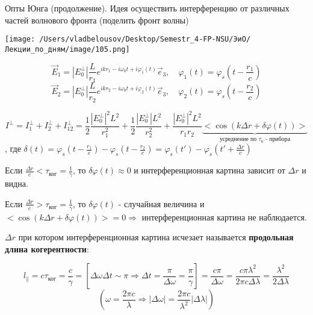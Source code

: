 \documentclass[12pt, a4paper]{report}
\begin{document}
\fi


Опты Юнга (продолжение). Идея осуществить интерференцию от различных частей волнового фронта (поделить фронт волны)

\begin{center}
    \texttt{[image: /Users/vladbelousov/Desktop/Semestr\_4-FP-NSU/ЭиО/Лекции\_по\_дням/image/105.png]}
\end{center}  

\[ \vec{E }  _1 = |E_0 ^{\perp }  | \frac{L}{r_1 } e^{i k r_1 - i \omega_0 t + i \varphi_1 (t)} \vec{e } _3   , \quad  \varphi_1 (t ) = \varphi_s \left(  t - \frac{r_1}{c}  \right)\] 
\[ \vec{E }  _2 = |E_0 ^{\perp }  | \frac{L}{r_2 } e^{i k r_2 - i \omega_0 t + i \varphi_2 (t)}\vec{e } _3  , \quad  \varphi_2 (t ) = \varphi_s \left(  t - \frac{r_2}{c}  \right)\] 

\[ I^{\perp } = I_1 ^{\perp } + I_2 ^{\perp } +I_{12} ^{\perp } =\frac{1}{2 }  \frac{|E_0  ^{\perp }  | ^2 L ^2 }{r_1 ^2 } + \frac{1}{2 }  \frac{|E_0 ^{\perp } |L ^2 }{r_2 ^2 } + \frac{|E_0 ^{\perp } | ^2 L ^2 }{ r_1 r_2 } \underbrace{<\cos (k \Delta r +\delta \varphi(t ))>  }_{\text{усреднение по } \tau_0 \text{ - прибора}  }      \] 
, где \( \displaystyle \delta(t ) = \varphi_s \left(  t - \frac{r_1 }{c} \right) - \varphi_s \left( t - \frac{r_2 }{c}  \right) = \varphi_s(t ' ) - \varphi_s \left( t ' + \frac{\Delta r }{c }  \right) \) 

Если \( \displaystyle  \frac{\Delta r }{ c } < \tau_{\text{ког} } =\frac{1}{\gamma}    \), то \( \delta \varphi (t ) \approx 0 \)  и интерференционная картина зависит от \( \Delta r \) и видна. 

Если \( \displaystyle  \frac{\Delta r }{c } > \tau _{\text{ког} } = \frac{1}{\gamma }    \), то \( \displaystyle  \delta \varphi (t )  \) - случайная величина и \( <\cos ( k \Delta r + \delta \varphi (t ))> = 0 \Rightarrow \)  интерференционная картина  не наблюдается. 

\( \Delta r  \)  при котором интерференционная картина исчезает называется \textbf{продольная длина когерентности}:

\[ l_{\parallel } = c \tau_{\text{ког} } = \frac{c}{\gamma } =\left[ \Delta \omega \Delta t \sim  \pi \Rightarrow \Delta t = \frac{\pi}{\Delta \omega } = \frac{\pi}{\gamma}   \right] = \frac{c \pi } {\Delta \omega } = \frac{ c \pi \lambda ^2 }{ 2 \pi c \Delta \lambda } = \frac{\lambda ^2 }{2 \Delta \lambda }       \] 
\[ \left( \omega = \frac{ 2 \pi c }{\lambda } \Rightarrow |\Delta \omega     |  = \frac{ 2 \pi c }{\lambda ^2 } |\Delta \lambda | \right) \] 
\end{document}
